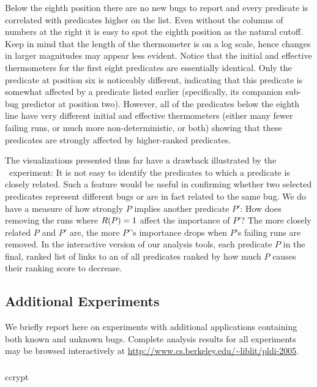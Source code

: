 Below the eighth position there are no new bugs to report and every
predicate is correlated with predicates higher on the list.  Even
without the columns of numbers at the right it is easy to spot the
eighth position as the natural cutoff.  Keep in mind that the length
of the thermometer is on a log scale, hence changes in larger
magnitudes may appear less evident.  Notice that the initial and
effective thermometers for the first eight predicates are essentially
identical.  Only the predicate at position six is noticeably
different, indicating that this predicate is somewhat affected by a
predicate listed earlier (specifically, its companion sub-bug
predictor at position two).  However, all of the predicates below the
eighth line have very different initial and effective thermometers
(either many fewer failing runs, or much more non-deterministic, or
both) showing that these predicates are strongly affected by
higher-ranked predicates.

The visualizations presented thus far have a drawback illustrated by
the \moss\ experiment: It is not easy to identify the predicates to
which a predicate is closely related.  Such a feature would be useful
in confirming whether two selected predicates represent different bugs
or are in fact related to the same bug.  We do have a measure of how
strongly $P$ implies another predicate $P'$: How does removing the
runs where $R(P) = 1$ affect the importance of $P'$?  The more
closely related $P$ and $P'$ are, the more $P'$'s importance drops
when $P$'s failing runs are removed.  In the interactive version of
our analysis tools, each predicate $P$ in the final, ranked list of
links to an  of all
predicates ranked by how much $P$ causes their ranking score to
decrease.

\subsection{Additional Experiments}

We briefly report here on experiments with additional applications
containing both known and unknown bugs.  Complete analysis results for
all experiments may be browsed interactively at
\url{http://www.cs.berkeley.edu/~liblit/pldi-2005}.

\subsubsection{\ccrypt}

\begin{view}{\ccrypt}{ccrypt}
  
\end{view}

